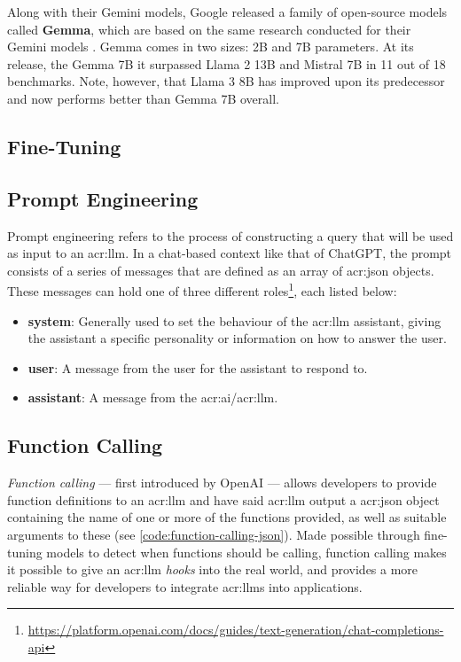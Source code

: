 Along with their Gemini models, Google released a family of open-source models called \textbf{Gemma}, which are based on the same research conducted for their Gemini models \citep{gemmateamGemmaOpenModels2024}. Gemma comes in two sizes: 2B and 7B parameters. At its release, the Gemma 7B it surpassed Llama 2 13B and Mistral 7B  in 11 out of 18 benchmarks. Note, however, that Llama 3 8B has improved upon its predecessor and now performs better than Gemma 7B overall.

\subsection{Fine-Tuning}
\label{subsec:fine-tuning}

\subsection{Prompt Engineering}
\label{subsec:prompt-engineering}

Prompt engineering refers to the process of constructing a query that will be used as input to an \acrshort{acr:llm}. In a chat-based context like that of ChatGPT, the prompt consists of a series of messages that are defined as an array of \acrshort{acr:json} objects. These messages can hold one of three different roles\footnote{\url{https://platform.openai.com/docs/guides/text-generation/chat-completions-api}}, each listed below:

\begin{itemize}
    \item \textbf{system}: Generally used to set the behaviour of the \acrshort{acr:llm} assistant, giving the assistant a specific personality or information on how to answer the user.
    \item \textbf{user}: A message from the user for the assistant to respond to.
    \item \textbf{assistant}: A message from the \acrshort{acr:ai}/\acrshort{acr:llm}.
\end{itemize}

\subsection[Function Calling LLMs]{Function Calling }
\label{subsec:function-calling}

\textit{Function calling} --- first introduced by OpenAI \citep{eletiFunctionCallingOther2023} --- allows developers to provide function definitions to an \gls{acr:llm} and have said \gls{acr:llm} output a \acrshort{acr:json} object containing the name of one or more of the functions provided, as well as suitable arguments to these (see \autoref{code:function-calling-json}). Made possible through fine-tuning models to detect when functions should be calling, function calling makes it possible to give an \gls{acr:llm} \textit{hooks} into the real world, and provides a more reliable way for developers to integrate \glspl{acr:llm} into applications.

